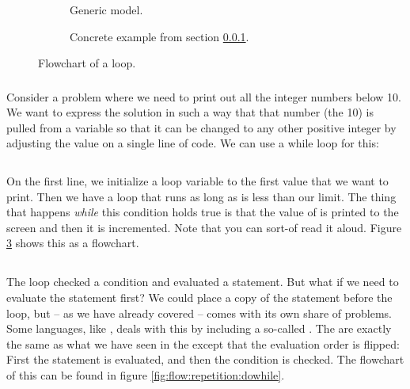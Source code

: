 \begin{figure}[tbp]
  \newcommand{\figscale}[0]{0.8}
  \begin{subfigure}[t]{0.5\textwidth}
    \centering
    \scalebox{\figscale}{}
    \caption{Generic model.}
    \label{fig:flow:repetition:while}
  \end{subfigure}
  \begin{subfigure}[t]{0.5\textwidth}
    \centering
    \scalebox{\figscale}{}
    \caption{Concrete example from section \ref{sec:flow:repetition:while:cs}.}
    \label{fig:flow:repetition:while:concrete}
  \end{subfigure}
  \caption{Flowchart of a  loop.}
\end{figure}

\subsubsection{\csharp}
\label{sec:flow:repetition:while:cs}

Consider a problem where we need to print out all the integer numbers below 10. We want to express the solution in such a way that that number (the 10) is pulled from a variable so that it can be changed to any other positive integer by adjusting the value on a single line of code. We can use a while loop for this:

\inputminted[linenos]{csharp}{../src/csharp/flow_repetition/while/Program.cs}

On the first line, we initialize a loop variable to the first value that we want to print. Then we have a loop that runs as long as  is less than our limit. The thing that happens \textsl{while} this condition holds true is that the value of  is printed to the screen and then it is incremented. Note that you can sort-of read it aloud. Figure \ref{fig:flow:repetition:while:concrete} shows this as a flowchart.

\subsection{}

The  loop checked a condition and evaluated a statement. But what if we need to evaluate the statement first? We could place a copy of the statement before the loop, but -- as we have already covered --  comes with its own share of problems. Some languages, like \csharp, deals with this by including a so-called . The  are exactly the same as what we have seen in the  except that the evaluation order is flipped: First the statement is evaluated, and then the condition is checked. The flowchart of this can be found in figure \ref{fig:flow:repetition:dowhile}.

